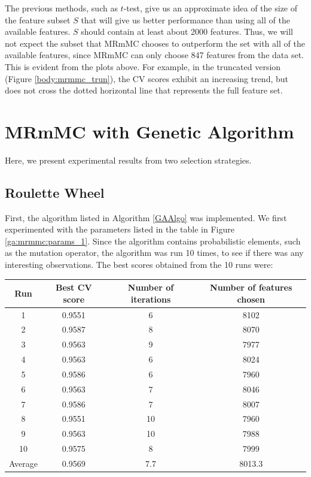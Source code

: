 \documentclass[12pt, twoside, a4paper]{report}
\begin{document}
The previous methods, such as $t$-test, give us an approximate idea of the size of the feature subset $S$ that will give us better performance than using all of the available features. $S$ should contain at least about 2000 features. Thus, we will not expect the subset that MRmMC chooses to outperform the set with all of the available features, since MRmMC can only choose 847 features from the data set. This is evident from the plots above. For example, in the truncated version (Figure \ref{body:mrmmc_trun}), the CV scores exhibit an increasing trend, but does not cross the dotted horizontal line that represents the full feature set.


\section{MRmMC with Genetic Algorithm}

Here, we present experimental results from two selection strategies.

\subsection{Roulette Wheel}

First, the algorithm listed in Algorithm \ref{GAAlgo} was implemented. We first experimented with the parameters listed in the table in Figure \ref{ga:mrmmc:params_1}. Since the algorithm contains probabilistic elements, such as the mutation operator, the algorithm was run 10 times, to see if there was any interesting observations. The best scores obtained from the 10 runs were:
\begin{center}
    \begin{tabular}{| c | c | c | c | } \hline
    Run & Best CV score & Number of iterations & Number of features chosen \\ \hline \hline
    1 & 0.9551 & 6 & 8102 \\ \hline
	2 & 0.9587 & 8 & 8070 \\ \hline
	3 & 0.9563 & 9 & 7977 \\ \hline
	4 & 0.9563 & 6 & 8024 \\ \hline
	5 & 0.9586 & 6 & 7960 \\ \hline
	6 & 0.9563 & 7 & 8046 \\ \hline
	7 & 0.9586 & 7 & 8007 \\ \hline
	8 & 0.9551 & 10 & 7960 \\ \hline
	9 & 0.9563 & 10 & 7988 \\ \hline
	10 & 0.9575 & 8 & 7999 \\ \hline
	Average & 0.9569 & 7.7 & 8013.3 \\ \hline
    \end{tabular}
\end{center}
\end{document}
